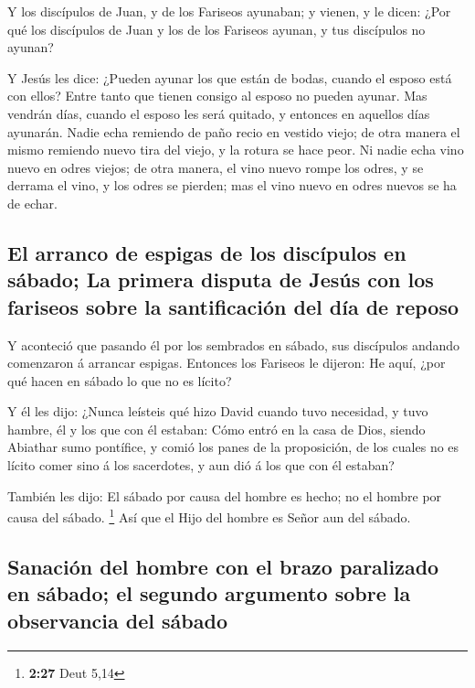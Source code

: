  Y los discípulos de Juan, y de los Fariseos ayunaban; y
vienen, y le dicen: ¿Por qué los discípulos de Juan y los de los
Fariseos ayunan, y tus discípulos no ayunan?

 Y Jesús les dice: ¿Pueden ayunar los que están de bodas,
cuando el esposo está con ellos? Entre tanto que tienen consigo al
esposo no pueden ayunar.  Mas vendrán días, cuando el
esposo les será quitado, y entonces en aquellos días ayunarán.
 Nadie echa remiendo de paño recio en vestido viejo; de
otra manera el mismo remiendo nuevo tira del viejo, y la rotura se hace
peor.  Ni nadie echa vino nuevo en odres viejos; de otra
manera, el vino nuevo rompe los odres, y se derrama el vino, y los odres
se pierden; mas el vino nuevo en odres nuevos se ha de echar.

\hypertarget{el-arranco-de-espigas-de-los-discuxedpulos-en-suxe1bado-la-primera-disputa-de-jesuxfas-con-los-fariseos-sobre-la-santificaciuxf3n-del-duxeda-de-reposo}{%
\subsection{El arranco de espigas de los discípulos en sábado; La
primera disputa de Jesús con los fariseos sobre la santificación del día
de
reposo}\label{el-arranco-de-espigas-de-los-discuxedpulos-en-suxe1bado-la-primera-disputa-de-jesuxfas-con-los-fariseos-sobre-la-santificaciuxf3n-del-duxeda-de-reposo}}

 Y aconteció que pasando él por los sembrados en sábado,
sus discípulos andando comenzaron á arrancar espigas. 
Entonces los Fariseos le dijeron: He aquí, ¿por qué hacen en sábado lo
que no es lícito?

 Y él les dijo: ¿Nunca leísteis qué hizo David cuando tuvo
necesidad, y tuvo hambre, él y los que con él estaban: 
Cómo entró en la casa de Dios, siendo Abiathar sumo pontífice, y comió
los panes de la proposición, de los cuales no es lícito comer sino á los
sacerdotes, y aun dió á los que con él estaban?

 También les dijo: El sábado por causa del hombre es hecho;
no el hombre por causa del sábado. \footnote{\textbf{2:27} Deut 5,14}
 Así que el Hijo del hombre es Señor aun del sábado.

\hypertarget{sanaciuxf3n-del-hombre-con-el-brazo-paralizado-en-suxe1bado-el-segundo-argumento-sobre-la-observancia-del-suxe1bado}{%
\subsection{Sanación del hombre con el brazo paralizado en sábado; el
segundo argumento sobre la observancia del
sábado}\label{sanaciuxf3n-del-hombre-con-el-brazo-paralizado-en-suxe1bado-el-segundo-argumento-sobre-la-observancia-del-suxe1bado}}

